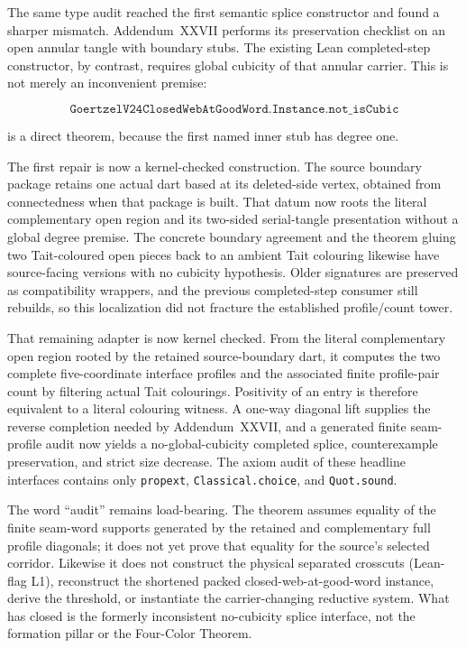 \documentclass[11pt]{article}
\theoremstyle{definition}
\begin{document}
The same type audit reached the first semantic splice constructor and found a
sharper mismatch.  Addendum~XXVII performs its preservation checklist on an
open annular tangle with boundary stubs.  The existing Lean completed-step
constructor, by contrast, requires global cubicity of that annular carrier.
This is not merely an inconvenient premise:

\[
  \texttt{GoertzelV24ClosedWebAtGoodWord.Instance.not\_isCubic}
\]

is a direct theorem, because the first named inner stub has degree one.

The first repair is now a kernel-checked construction.  The source boundary
package retains one actual dart based at its deleted-side vertex, obtained
from connectedness when that package is built.  That datum now roots the
literal complementary open region and its two-sided serial-tangle
presentation without a global degree premise.  The concrete boundary
agreement and the theorem gluing two Tait-coloured open pieces back to an
ambient Tait colouring likewise have source-facing versions with no cubicity
hypothesis.  Older signatures are preserved as compatibility wrappers, and
the previous completed-step consumer still rebuilds, so this localization did
not fracture the established profile/count tower.

That remaining adapter is now kernel checked.  From the literal complementary
open region rooted by the retained source-boundary dart, it computes the two
complete five-coordinate interface profiles and the associated finite
profile-pair count by filtering actual Tait colourings.  Positivity of an
entry is therefore equivalent to a literal colouring witness.  A one-way
diagonal lift supplies the reverse completion needed by Addendum~XXVII, and a
generated finite seam-profile audit now yields a no-global-cubicity completed
splice, counterexample preservation, and strict size decrease.  The axiom
audit of these headline interfaces contains only
\texttt{propext}, \texttt{Classical.choice}, and \texttt{Quot.sound}.

The word ``audit'' remains load-bearing.  The theorem assumes equality of the
finite seam-word supports generated by the retained and complementary full
profile diagonals; it does not yet prove that equality for the source's
selected corridor.  Likewise it does not construct the physical separated
crosscuts (Lean-flag L1), reconstruct the shortened packed
closed-web-at-good-word instance, derive the threshold, or instantiate the
carrier-changing reductive system.  What has closed is the formerly
inconsistent no-cubicity splice interface, not the formation pillar or the
Four-Color Theorem.
\end{document}
